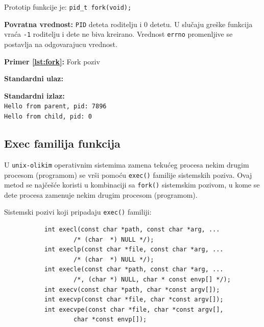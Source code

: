 \documentclass[a4paper, 11pt, twoside]{article}
\newcommand{\scode}[3] {
	\hspace{.06\textwidth} 
	\begin{minipage}[t]{.88\textwidth} %
		\begin{mdframed}[topline=true,bottomline=true,leftline=true,rightline=true,backgroundcolor=gray!22, linecolor=gray!60!black,roundcorner=1mm]
			 

	\begin{center}
		\caption{\textbf{Primer \ref{lst:#3}:} #2}
	\end{center}
	\end{mdframed}
	\end{minipage}

}
\newcommand{\stdio}[4] {
	\hspace{.06\textwidth} 
	\begin{minipage}[t]{.88\textwidth} %
		\begin{mdframed}[backgroundcolor=black!7,topline=true,bottomline=true,leftline=true,rightline=true,roundcorner=1mm]
		\begin{minipage}[t]{.5\textwidth} %
			\textbf{#1} \\
				\texttt{#3}
		\end{minipage}
		\begin{minipage}[t]{.5\textwidth} %
			\textbf{#2} \\
				\texttt{#4}
		\end{minipage}
		\end{mdframed}
	\end{minipage}
	\vspace{3mm} 
}
\begin{document}
Prototip funkcije je: \texttt{pid\_t fork(void);} \\

\vspace{-6mm} 

\textbf{Povratna vrednost:} \texttt{PID} deteta roditelju i 0 detetu. U slučaju greške funkcija vraća \texttt{-1} roditelju i dete ne biva kreirano. Vrednost \texttt{errno} promenljive se postavlja na odgovarajucu vrednost.

\scode{fork.c}{Fork poziv}{fork}
\stdio{Standardni ulaz:}{Standardni izlaz:}{}{Hello from parent, pid: 7896 \\ Hello from child, pid: 0}


\newpage

\subsection{Exec familija funkcija}

U \texttt{unix-olikim} operativnim sistemima zamena tekućeg procesa nekim drugim procesom (programom) se vrši pomoću \texttt{exec()} familije sistemskih poziva. Ovaj metod se najčešće koristi u kombinaciji sa \texttt{fork()} sistemskim pozivom, u kome se dete procesa zamenuje nekim drugim procesom (programom). 

Sistemski pozivi koji pripadaju \texttt{exec()} familiji:

\hspace{.15\textwidth} 
\begin{minipage}[t]{.7\textwidth} %
	\begin{verbatim}
	       int execl(const char *path, const char *arg, ...
			       /* (char  *) NULL */);
	       int execlp(const char *file, const char *arg, ...
			       /* (char  *) NULL */);
	       int execle(const char *path, const char *arg, ...
			       /*, (char *) NULL, char * const envp[] */);
	       int execv(const char *path, char *const argv[]);
	       int execvp(const char *file, char *const argv[]);
	       int execvpe(const char *file, char *const argv[],
			       char *const envp[]);
       \end{verbatim}
\end{minipage}
\end{document}
